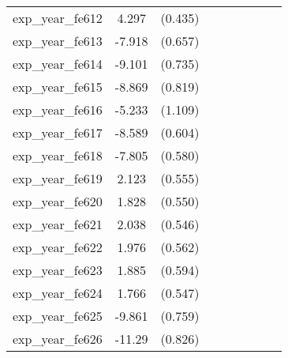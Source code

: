 {\begin{tabular}{l*{4}{cc}}
exp\_year\_fe612&    4.297\sym{***}&  (0.435)&                  &         &                  &         &                  &         \\
exp\_year\_fe613&   -7.918\sym{***}&  (0.657)&                  &         &                  &         &                  &         \\
exp\_year\_fe614&   -9.101\sym{***}&  (0.735)&                  &         &                  &         &                  &         \\
exp\_year\_fe615&   -8.869\sym{***}&  (0.819)&                  &         &                  &         &                  &         \\
exp\_year\_fe616&   -5.233\sym{***}&  (1.109)&                  &         &                  &         &                  &         \\
exp\_year\_fe617&   -8.589\sym{***}&  (0.604)&                  &         &                  &         &                  &         \\
exp\_year\_fe618&   -7.805\sym{***}&  (0.580)&                  &         &                  &         &                  &         \\
exp\_year\_fe619&    2.123\sym{***}&  (0.555)&                  &         &                  &         &                  &         \\
exp\_year\_fe620&    1.828\sym{***}&  (0.550)&                  &         &                  &         &                  &         \\
exp\_year\_fe621&    2.038\sym{***}&  (0.546)&                  &         &                  &         &                  &         \\
exp\_year\_fe622&    1.976\sym{***}&  (0.562)&                  &         &                  &         &                  &         \\
exp\_year\_fe623&    1.885\sym{**} &  (0.594)&                  &         &                  &         &                  &         \\
exp\_year\_fe624&    1.766\sym{**} &  (0.547)&                  &         &                  &         &                  &         \\
exp\_year\_fe625&   -9.861\sym{***}&  (0.759)&                  &         &                  &         &                  &         \\
exp\_year\_fe626&   -11.29\sym{***}&  (0.826)&                  &         &                  &         &                  &         \\

\end{tabular}}
